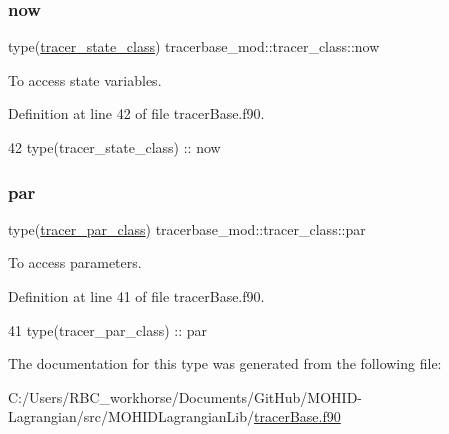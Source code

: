 \subsubsection{\texorpdfstring{now}{now}}
{\footnotesize\ttfamily type(\mbox{\hyperlink{structtracerbase__mod_1_1tracer__state__class}{tracer\+\_\+state\+\_\+class}}) tracerbase\+\_\+mod\+::tracer\+\_\+class\+::now\hspace{0.3cm}{\ttfamily [private]}}



To access state variables. 



Definition at line 42 of file tracer\+Base.\+f90.


\begin{DoxyCode}
42         \textcolor{keywordtype}{type}(tracer\_state\_class) :: now
\end{DoxyCode}
\mbox{\label{structtracerbase__mod_1_1tracer__class_aca04297200aad39fd04e31b630d9ca50}} 
\subsubsection{\texorpdfstring{par}{par}}
{\footnotesize\ttfamily type(\mbox{\hyperlink{structtracerbase__mod_1_1tracer__par__class}{tracer\+\_\+par\+\_\+class}}) tracerbase\+\_\+mod\+::tracer\+\_\+class\+::par\hspace{0.3cm}{\ttfamily [private]}}



To access parameters. 



Definition at line 41 of file tracer\+Base.\+f90.


\begin{DoxyCode}
41         \textcolor{keywordtype}{type}(tracer\_par\_class)   :: par
\end{DoxyCode}


The documentation for this type was generated from the following file\+:\begin{DoxyCompactItemize}
\item 
C\+:/\+Users/\+R\+B\+C\+\_\+workhorse/\+Documents/\+Git\+Hub/\+M\+O\+H\+I\+D-\/\+Lagrangian/src/\+M\+O\+H\+I\+D\+Lagrangian\+Lib/\mbox{\hyperlink{tracer_base_8f90}{tracer\+Base.\+f90}}\end{DoxyCompactItemize}
